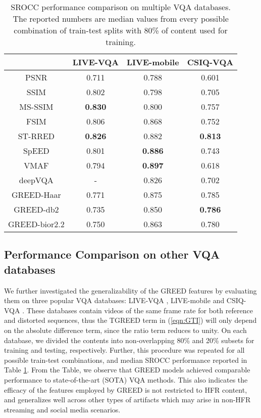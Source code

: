 \documentclass[journal]{IEEEtran}
\begin{document}
\begin{table}[t]
\caption{SROCC performance comparison on multiple VQA databases. The reported numbers are median values from every possible combination of train-test splits with 80\% of content used for training.}
    \label{Table:VQA_database}
    \centering
    \footnotesize
    \begin{tabular}{|c||c|c|c|}
        \hline
        ~    & LIVE-VQA  & LIVE-mobile & CSIQ-VQA \\ \hline \hline 
        PSNR & 0.711 & 0.788 & 0.601 \\ 
        SSIM \cite{wang2004image} & 0.802 & 0.798 & 0.705 \\ 
        MS-SSIM \cite{wang2003multiscale} & \textbf{0.830} & 0.800 & 0.757 \\ 
        FSIM \cite{zhang2011fsim} & 0.806 & 0.868 & 0.752 \\ 
        ST-RRED \cite{soundararajan2012video} & \textbf{0.826} & 0.882 & \textbf{0.813} \\ 
        SpEED \cite{bampis2017speed} & 0.801 & \textbf{0.886} & 0.743 \\ 
        VMAF \cite{VMAF2016}& 0.794 & \textbf{0.897} & 0.618 \\
        deepVQA \cite{kim2018deep} & - & 0.826 & 0.702 \\ \hline
        GREED-Haar & 0.771 & 0.875 & 0.785 \\
        GREED-db2 & 0.735 & 0.850 & \textbf{0.786} \\
        GREED-bior2.2 & 0.750 & 0.863 & 0.780 \\
        \hline
    \end{tabular}
\end{table}

\subsection{Performance Comparison on other VQA databases}
We further investigated the generalizability of the GREED features by evaluating them on three popular VQA databases: LIVE-VQA \cite{seshadrinathan2010study}, LIVE-mobile \cite{moorthy2012video} and CSIQ-VQA \cite{vu2014vis3}. These databases contain videos of the same frame rate for both reference and distorted sequences, thus the TGREED term in (\ref{eqn:GTI}) will only depend on the absolute difference term, since the ratio term reduces to unity. On each database, we divided the contents into non-overlapping 80\% and 20\% subsets for training and testing, respectively. Further, this procedure was repeated for all possible train-test combinations, and median SROCC performance reported in Table \ref{Table:VQA_database}. From the Table, we observe that GREED models achieved comparable performance to state-of-the-art (SOTA) VQA methods. This also indicates the efficacy of the features employed by GREED is not restricted to HFR content, and generalizes well across other types of artifacts which may arise in non-HFR streaming and social media scenarios. 
\end{document}
